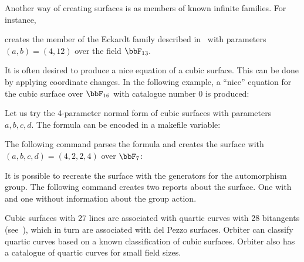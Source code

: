 Another way of creating surfaces is as members of known infinite families.
For instance, 
{\tt

}
creates the member of the Eckardt family  
described in~\cite{BettenKaraoglu19a} 
with parameters $(a,b) = (4,12)$ over the field $\bbF_{13}.$

\bigskip



It is often desired to produce a nice equation of a cubic surface. This can be done by applying 
coordinate changes. In the following example, a ``nice'' equation for the cubic surface over $\bbF_{16}$
with catalogue number 0 is produced:
{\tt

}


\bigskip



Let us try the 4-parameter normal form of cubic surfaces with parameters $a,b,c,d.$ 
The formula can be encoded in a makefile variable:
{\tt

}
The following command parses the formula and creates the surface with $(a,b,c,d)=(4,2,2,4)$ over $\bbF_7$:
{\tt

}


\bigskip

It is possible to recreate the surface with the generators for the automorphism group.
The following command creates two reports about the surface. 
One with and one without information about the group action.
{\tt

}



Cubic surfaces with 27 lines are associated with 
quartic curves with 28 bitangents (see~\cite{Hirschfeld82}), 
which in turn are associated with del Pezzo surfaces. 
Orbiter can classify quartic curves based on a known classification of cubic surfaces.
Orbiter also has a catalogue of quartic curves for small field sizes.

\bigskip



